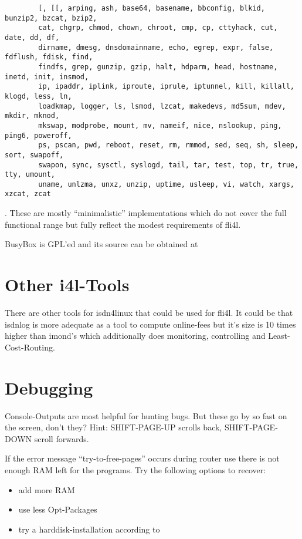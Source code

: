 \begin{example}
\begin{verbatim}
        [, [[, arping, ash, base64, basename, bbconfig, blkid, bunzip2, bzcat, bzip2,
        cat, chgrp, chmod, chown, chroot, cmp, cp, cttyhack, cut, date, dd, df,
        dirname, dmesg, dnsdomainname, echo, egrep, expr, false, fdflush, fdisk, find,
        findfs, grep, gunzip, gzip, halt, hdparm, head, hostname, inetd, init, insmod,
        ip, ipaddr, iplink, iproute, iprule, iptunnel, kill, killall, klogd, less, ln,
        loadkmap, logger, ls, lsmod, lzcat, makedevs, md5sum, mdev, mkdir, mknod,
        mkswap, modprobe, mount, mv, nameif, nice, nslookup, ping, ping6, poweroff,
        ps, pscan, pwd, reboot, reset, rm, rmmod, sed, seq, sh, sleep, sort, swapoff,
        swapon, sync, sysctl, syslogd, tail, tar, test, top, tr, true, tty, umount,
        uname, unlzma, unxz, unzip, uptime, usleep, vi, watch, xargs, xzcat, zcat
\end{verbatim}
\end{example}

    \noindent . These are mostly ``minimalistic'' implementations which 
    do not cover the full functional range but fully reflect the modest
    requirements of fli4l.

    BusyBox is GPL'ed and its source can be obtained at



    \section{Other i4l-Tools}

    There are other tools for isdn4linux that could be used for fli4l.
    It could be that isdnlog is more adequate as a tool to compute online-fees 
    but it's size is 10 times higher than imond's which additionally does monitoring,
    controlling and Least-Cost-Routing.

    \section{Debugging}

    Console-Outputs are most helpful for hunting bugs. But these go by so fast
    on the screen, don't they? Hint: SHIFT-PAGE-UP scrolls back,
    SHIFT-PAGE-DOWN scroll forwards.

    If the error message ``try-to-free-pages'' occurs during router use
    there is not enough RAM left for the programs. Try the following
    options to recover:
    \begin{itemize}
    \item add more RAM
    \item use less Opt-Packages
    \item try a harddisk-installation according to 
    \end{itemize}

